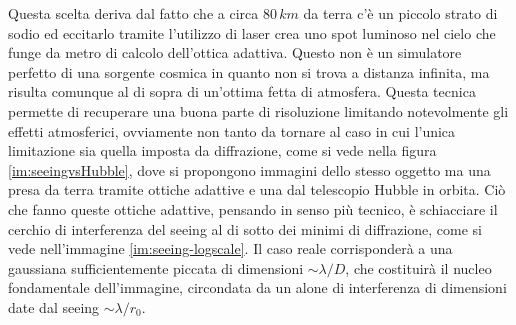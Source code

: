 Questa scelta deriva dal fatto che a circa $80\, km$ da terra c'è un piccolo strato di sodio ed eccitarlo tramite l'utilizzo di laser crea uno spot luminoso nel cielo che funge da metro di calcolo dell'ottica adattiva. Questo non è un simulatore perfetto di una sorgente cosmica in quanto non si trova a distanza infinita, ma risulta comunque al di sopra di un'ottima fetta di atmosfera. Questa tecnica permette di recuperare una buona parte di risoluzione limitando notevolmente gli effetti atmosferici, ovviamente non tanto da tornare al caso in cui l'unica limitazione sia quella imposta da diffrazione, come si vede nella figura \ref{im:seeingvsHubble}, dove si propongono immagini dello stesso oggetto ma una presa da terra tramite ottiche adattive e una dal telescopio Hubble in orbita. Ciò che fanno queste ottiche adattive, pensando in senso più tecnico, è schiacciare il cerchio di interferenza del seeing al di sotto dei minimi di diffrazione, come si vede nell'immagine \ref{im:seeing-logscale}. Il caso reale corrisponderà a una gaussiana sufficientemente piccata di dimensioni $\sim \lambda/D$, che costituirà il nucleo fondamentale dell'immagine, circondata da un alone di interferenza di dimensioni date dal seeing $\sim \lambda/r_0$.